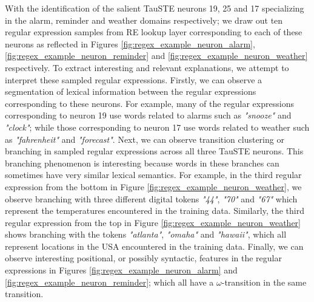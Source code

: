 With the identification of the salient TauSTE neurons 19, 25 and 17 specializing
in the alarm, reminder and weather domains respectively; we draw out ten regular
expression samples from RE lookup layer corresponding to each of these neurons
as reflected in Figures \ref{fig:regex_example_neuron_alarm},
\ref{fig:regex_example_neuron_reminder} and
\ref{fig:regex_example_neuron_weather} respectively. To extract interesting and
relevant explanations, we attempt to interpret these sampled regular
expressions. Firstly, we can observe a segmentation of lexical information
between the regular expressions corresponding to these neurons. For example,
many of the regular expressions corresponding to neuron 19 use words related to
alarms such as \textit{"snooze"} and \textit{"clock"}; while those corresponding to neuron 17 use
words related to weather such as \textit{"fahrenheit"} and \textit{"forecast"}. Next, we can
observe transition clustering or branching in sampled regular expressions across
all three TauSTE neurons. This branching phenomenon is interesting because words
in these branches can sometimes have very similar lexical semantics. For
example, in the third regular expression from the bottom in Figure
\ref{fig:regex_example_neuron_weather}, we observe branching with three
different digital tokens \textit{"44"}, \textit{"70"} and \textit{"67"} which
represent the temperatures encountered in the training data. Similarly, the
third regular expression from the top in Figure
\ref{fig:regex_example_neuron_weather} shows branching with the tokens
\textit{"atlanta"}, \textit{"omaha"} and \textit{"hawaii"}, which all represent
locations in the USA encountered in the training data. Finally, we can observe
interesting positional, or possibly syntactic, features in the regular
expressions in Figures \ref{fig:regex_example_neuron_alarm} and
\ref{fig:regex_example_neuron_reminder}; which all have a $\omega$-transition in
the same transition.

